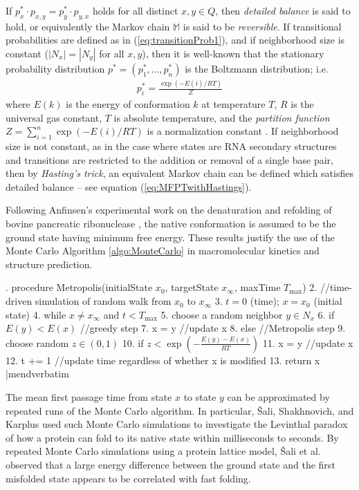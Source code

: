 If $p^*_x \cdot p_{x,y} = p^*_y \cdot p_{y,x}$ holds for all distinct
$x,y \in Q$, then
{\em detailed balance} is said to hold, or equivalently the Markov
chain $\mathbb{M}$ is said to be {\em reversible}.
If transitional probabilities
are defined as in (\ref{eq:transitionProb1}), and if neighborhood
size is constant ($|N_x|=|N_y|$ for all $x,y$), then it is well-known
that the stationary probability distribution
$p^*=(p^*_1,\ldots,p^*_n)$ is the Boltzmann distribution; i.e.
\begin{eqnarray}
\label{eq:stationaryBoltzmannProb}
p^*_i = \frac{\exp(-E(i)/RT)}{Z}
\end{eqnarray}
where $E(k)$ is the energy of conformation $k$ at temperature $T$,
$R$ is the universal gas constant,
$T$ is absolute temperature, and the {\em partition function}
$Z = \sum_{i=1}^n \exp(-E(i)/RT)$ is a normalization constant
\cite{waterman:book,cloteBackofen:book}. If neighborhood size is not
constant, as in the case where states are RNA secondary structures and transitions
are restricted to the addition or removal of a single base pair, then
by {\em Hasting's trick}, an equivalent Markov chain can be defined which
satisfies detailed balance -- see equation (\ref{eq:MFPTwithHastings}).

Following Anfinsen's experimental work on the denaturation and
refolding of bovine pancreatic ribonuclease \cite{anfinsen},
the native conformation is assumed to be the ground state having
minimum free energy. These results justify the use of the Monte Carlo
Algorithm \ref{algo:MonteCarlo} in macromolecular kinetics and
structure prediction.


. procedure Metropolis(initialState $x_0$, targetState $x_{\infty}$, maxTime $T_{\max}$)
 2. //time-driven simulation of random walk from $x_0$ to $x_{\infty}$
 3.   $t=0$ (time); $x=x_0$ (initial state)
 4.   while $x \ne x_{\infty}$ and $t< T_{\max}$
 5.     choose a random neighbor $y \in N_x$
 6.     if $E(y)<E(x)$  //greedy step
 7.       x = y         //update x
 8.     else            //Metropolis step
 9.       choose random $z \in (0,1)$
10.       if $z < \exp\left(-\frac{E(y)-E(x)}{RT}\right)$
11.         x = y      //update x
12.     t += 1  //update time regardless of whether x is modified
13.   return x
|mendverbatim

The mean first passage time from state $x$ to state $y$ can
be approximated by repeated runs of the Monte Carlo algorithm.
In particular, \v{S}ali, Shakhnovich, and Karplus used such Monte Carlo
simulations to investigate the Levinthal paradox of how a protein
can fold to its native state within milliseconds to seconds.
By repeated Monte Carlo simulations using a protein lattice model,
\v{S}ali et al. observed that a large energy difference between
the ground state
and the first misfolded state appears to be correlated with fast folding.

